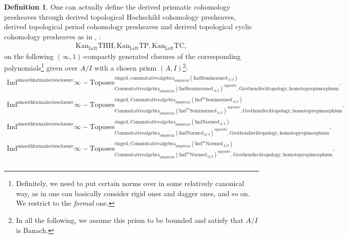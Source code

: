 \documentclass[11pt]{book}
\theoremstyle{definition}
\newtheorem{definition}[theorem]{Definition}
\numberwithin{equation}{section}
\begin{document}
\begin{definition}
\indent One can actually define the derived prismatic cohomology presheaves through derived topological Hochschild cohomology presheaves, derived topological period cohomology presheaves and derived topological cyclic cohomology presheaves as in \cite[Section 2.2, Section 2.3]{12BMS}, \cite[Theorem 1.13]{12BS}:
\begin{align}
	\mathrm{Kan}_{\mathrm{Left}}\mathrm{THH},\mathrm{Kan}_{\mathrm{Left}}\mathrm{TP},\mathrm{Kan}_{\mathrm{Left}}\mathrm{TC},
\end{align}
on the following $(\infty,1)$-compactly generated closures of the corresponding polynomials\footnote{Definitely, we need to put certain norms over in some relatively canonical way, as in \cite[Section 4.2]{BBM} one can basically consider rigid ones and dagger ones, and so on. We restrict to the \textit{formal} one.} given over $A/I$ with a chosen prism $(A,I)$\footnote{In all the following, we assume this prism to be bounded and satisfy that $A/I$ is Banach.}:
\begin{align}
\mathrm{Ind}^\text{smoothformalseriesclosure}\infty-\mathrm{Toposes}^{\mathrm{ringed},\mathrm{commutativealgebra}_{\mathrm{simplicial}}(\mathrm{Ind}\mathrm{Seminormed}_{A/I})}_{\mathrm{Commutativealgebra}_{\mathrm{simplicial}}(\mathrm{Ind}\mathrm{Seminormed}_{A/I})^\mathrm{opposite},\mathrm{Grothendiecktopology,homotopyepimorphism}}. \\
\mathrm{Ind}^\text{smoothformalseriesclosure}\infty-\mathrm{Toposes}^{\mathrm{ringed},\mathrm{Commutativealgebra}_{\mathrm{simplicial}}(\mathrm{Ind}^m\mathrm{Seminormed}_{A/I})}_{\mathrm{Commutativealgebra}_{\mathrm{simplicial}}(\mathrm{Ind}^m\mathrm{Seminormed}_{A/I})^\mathrm{opposite},\mathrm{Grothendiecktopology,homotopyepimorphism}}.\\
\mathrm{Ind}^\text{smoothformalseriesclosure}\infty-\mathrm{Toposes}^{\mathrm{ringed},\mathrm{Commutativealgebra}_{\mathrm{simplicial}}(\mathrm{Ind}\mathrm{Normed}_{A/I})}_{\mathrm{Commutativealgebra}_{\mathrm{simplicial}}(\mathrm{Ind}\mathrm{Normed}_{A/I})^\mathrm{opposite},\mathrm{Grothendiecktopology,homotopyepimorphism}}.\\
\mathrm{Ind}^\text{smoothformalseriesclosure}\infty-\mathrm{Toposes}^{\mathrm{ringed},\mathrm{Commutativealgebra}_{\mathrm{simplicial}}(\mathrm{Ind}^m\mathrm{Normed}_{A/I})}_{\mathrm{Commutativealgebra}_{\mathrm{simplicial}}(\mathrm{Ind}^m\mathrm{Normed}_{A/I})^\mathrm{opposite},\mathrm{Grothendiecktopology,homotopyepimorphism}}.\\

\end{align}
\end{definition}
\end{document}
